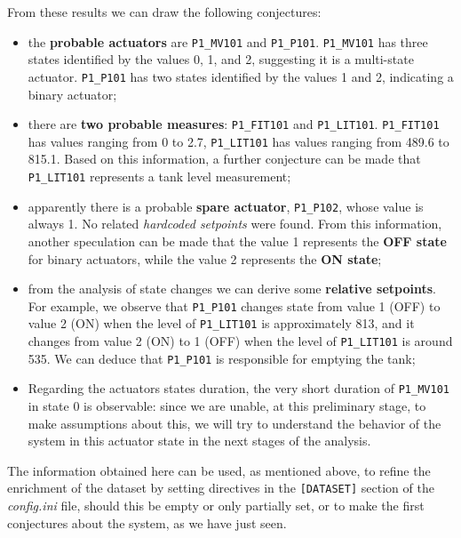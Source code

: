 From these results we can draw the following conjectures: 

\begin{itemize}
	\item the \textbf{probable actuators} are \texttt{P1\_MV101} and \texttt{P1\_P101}. \texttt{P1\_MV101} has three states identified by the values 0, 1, and 2, suggesting it is a multi-state actuator. \texttt{P1\_P101} has two states identified by the values 1 and 2, indicating a binary actuator;
	
	\item there are \textbf{two probable measures}: \texttt{P1\_FIT101} and \texttt{P1\_LIT101}. \texttt{P1\_FIT101} has values ranging from 0 to 2.7, \texttt{P1\_LIT101} has values ranging from 489.6 to 815.1. Based on this information, a further conjecture can be made that \texttt{P1\_LIT101} represents a tank level measurement;
		
	\item apparently there is a probable \textbf{spare actuator}, \texttt{P1\_P102}, whose value is always 1. No related \textit{hardcoded setpoints} were found. From this information, another speculation can be made that the value 1 represents the \textbf{OFF state} for binary actuators, while the value 2 represents the \textbf{ON state};
	
	\item from the analysis of state changes we can derive some \textbf{relative setpoints}. For example, we observe that \texttt{P1\_P101} changes state from value 1 (OFF) to value 2 (ON) when the level of \texttt{P1\_LIT101} is approximately 813, and it changes from value 2 (ON) to 1 (OFF) when the level of \texttt{P1\_LIT101} is around 535. We can deduce that \texttt{P1\_P101} is responsible for emptying the tank;
	
	\item Regarding the actuators states duration, the very short duration of \texttt{P1\_MV101} in state 0 is observable: since we are unable, at this preliminary stage, to make assumptions about this, we will try to understand the behavior of the system in this actuator state in the next stages of the analysis.
\end{itemize}

The information obtained here can be used, as mentioned above, to refine the enrichment of the dataset by setting directives in the \texttt{[DATASET]} section of the \textit{config.ini} file, should this be empty or only partially set, or to make the first conjectures about the system, as we have just seen.

